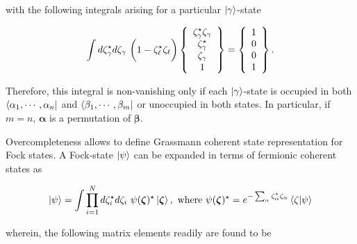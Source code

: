 \begin{tcolorbox}[colback=yellow!10!white,colframe=red!75!black,lowerbox=invisible]

with the following integrals arising for a particular $\ket{\gamma}$-state

\begin{equation}
    \int d\zeta_{\gamma}^\star  d\zeta_{\gamma} \textnormal{ } \bigg(1- \zeta^\star_\ell\zeta_\ell \bigg) \left\{\begin{array}{c}
         \zeta_{\gamma}^\star \zeta_{\gamma} \\ \zeta_{\gamma}^\star \\
         \zeta_{\gamma} \\
         1
    \end{array}\right\} = \left\{\begin{array}{c}
         1  \\
         0  \\
         0  \\
         1
    \end{array}\right\}.
\end{equation}

Therefore, this integral is non-vanishing only if each $\ket{\gamma}$-state is occupied in both $\bra{\alpha_1, \cdots, \alpha_n}$ and $\bra{\beta_1, \cdots, \beta_m}$ or unoccupied in both states. In particular, if $m = n$, ${\bm \alpha}$ is a permutation of $\bm{\beta}$. 
\end{tcolorbox}

Overcompleteness allows to define Grassmann coherent state representation for Fock states. A Fock-state $\ket{\psi}$ can be expanded in terms of fermionic coherent states as 

$$
\ket{\psi} = \int \prod_{i=1}^{N} d{\zeta}^\star_i d\zeta_i \textnormal{ } \psi({\bm \zeta)^\star} \ket{\bm{\zeta}}, \textnormal{ where } \psi({\bm \zeta)^\star} = e^{- \sum_{\alpha} \zeta^\star_{\alpha} \zeta_\alpha} \bra{\zeta}\ket{\psi} 
$$

wherein, the following matrix elements readily are found to be 

